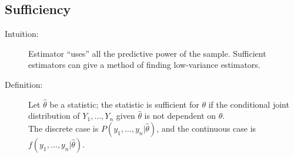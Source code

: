 \documentclass[10pt]{extarticle}
\begin{document}
  \subsection{Sufficiency}%
  \begin{description}
    \item[Intuition:] Estimator ``uses'' all the predictive power of the sample. Sufficient estimators can give a method of finding low-variance estimators.
    \item[Definition:] Let $\hat{\theta}$ be a statistic; the statistic is sufficient for $\theta$ if the conditional joint distribution of $Y_1,\dots,Y_n$ given $\hat{\theta}$ is not dependent on $\theta$.\\

      The discrete case is $P(y_1,\dots,y_n|\hat{\theta})$, and the continuous case is $f(y_1,\dots,y_n | \hat{\theta})$.\\


\end{description}
\end{document}
